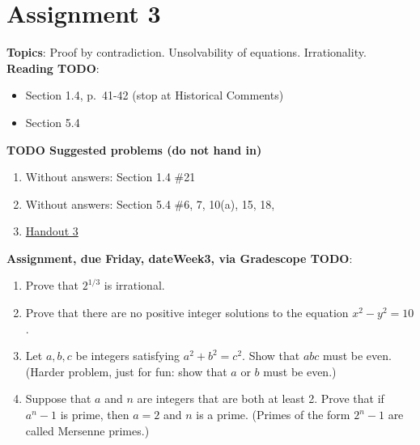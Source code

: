 \documentclass[12pt]{article}
\begin{document}
\section[3 (due \csname dateWeek3\endcsname): Proof by contradiction. Unsolvability. Irrationality.]{Assignment 3}

\textbf{Topics}: Proof by contradiction. Unsolvability of equations. Irrationality.
\\

\noindent \textbf{Reading TODO}:
\begin{itemize}
\item Section 1.4, p.~41-42 (stop at Historical Comments)
\item Section 5.4
\end{itemize}




\noindent \textbf{TODO Suggested problems (do not hand in)}

\begin{enumerate}
\item Without answers: Section 1.4 \#21
\item Without answers: Section 5.4 \#6, 7, 10(a), 15, 18,
\item \href{https://www.math.emory.edu/~dzb/teaching/250Fall2021/handouts/250-H03-contradiction.pdf}{Handout 3}
\end{enumerate}

\noindent \textbf{Assignment, due Friday, \csname dateWeek3\endcsname, via Gradescope TODO}:
\begin{enumerate}
\item Prove that $2^{1/3}$ is irrational.
\item Prove that there are no positive integer solutions to the equation $x^2 - y^2 = 10$.
\item Let $a, b, c$ be integers satisfying $a^2 + b^2 = c^2$. Show that $abc$ must be even. (Harder problem, just for fun: show that $a$ or $b$ must be even.)
\item Suppose that $a$ and $n$ are integers that are both at least 2. Prove that if $a^n -1$ is prime, then $a = 2$ and $n$ is a prime. (Primes of the form $2^n - 1$ are called Mersenne primes.)
\end{enumerate}
\end{document}
